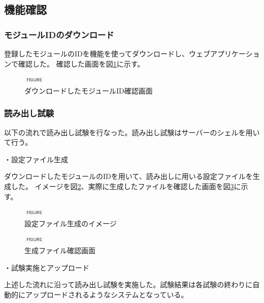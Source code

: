 \subsection{機能確認}
\subsubsection{モジュールIDのダウンロード}
登録したモジュールのIDを機能を使ってダウンロードし、ウェブアプリケーションで確認した。
確認した画面を図\ref{download_SCC}に示す。

\begin{figure}[bpt]\centering
\includegraphics[width=1cm]{figure}
\caption[ダウンロードしたモジュールID確認画面]{ダウンロードしたモジュールID確認画面}
\label{download_SCC}
\end{figure}

\subsubsection{読み出し試験}
以下の流れで読み出し試験を行なった。読み出し試験はサーバーのシェルを用いて行う。

・設定ファイル生成

ダウンロードしたモジュールのIDを用いて、読み出しに用いる設定ファイルを生成した。
イメージを図\ref{config_retriever}、実際に生成したファイルを確認した画面を図\ref{create_config}に示す。

\begin{figure}[bpt]\centering
\includegraphics[width=1cm]{figure}
\caption[設定ファイル生成のイメージ]{設定ファイル生成のイメージ}
\label{config_retriever}
\end{figure}

\begin{figure}[bpt]\centering
\includegraphics[width=1cm]{figure}
\caption[生成ファイル確認画面]{生成ファイル確認画面}
\label{create_config}
\end{figure}

・試験実施とアップロード

上述した流れに沿って読み出し試験を実施した。試験結果は各試験の終わりに自動的にアップロードされるようなシステムとなっている。

